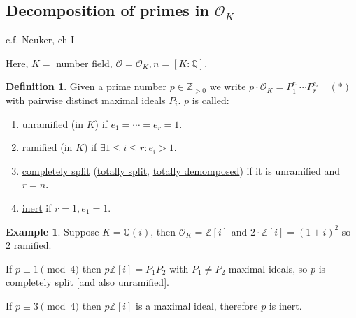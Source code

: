 \documentclass[openany]{amsbook}
\numberwithin{section}{chapter}
\theoremstyle{definition}
\newtheorem*{example}{Example}
\newtheorem*{definition}{Definition}
\begin{document}

\subsection*{Decomposition of primes in \(\mathcal{O}_K\)}

c.f. Neuker, ch I

Here, \(K =\) number field, \(\mathcal{O} = \mathcal{O}_K, n = [K : \mathbb{Q}]\).

\begin{definition}
    Given a prime number \(p \in \mathbb{Z}_{> 0}\) we write \(p \cdot \mathcal{O}_K = P_1^{e_1} \cdots P_r^{e_r} \quad (\ast)\) with pairwise distinct maximal ideals $P_i$. \(p\) is called:

    \begin{enumerate}[label=\roman*)]
        \item \underline{unramified} (in \(K\)) if \(e_1 = \cdots = e_r = 1\).
        \item \underline{ramified} (in \(K\)) if \(\exists 1 \leq i \leq r : e_i > 1\).
        \item \underline{completely split} (\underline{totally split}, \underline{totally demomposed}) if it is unramified and \(r = n\).
        \item \underline{inert} if \(r = 1, e_1 = 1\).
    \end{enumerate} 
\end{definition}

\begin{example}
    Suppose \(K = \mathbb{Q} (i)\), then \(\mathcal{O}_K = \mathbb{Z} [i]\) and \(2 \cdot \mathbb{Z} [i] = (1+i)^2\) so \(2\) ramified.

    If \(p \equiv 1 \pmod 4\) then \(p \mathbb{Z} [i] = P_1 P_2\) with \(P_1 \neq P_2\) maximal ideals, so \(p\) is completely split [and also unramified].
    
    If \(p \equiv 3 \pmod 4\) then \(p \mathbb{Z} [i]\) is a maximal ideal, therefore \(p\) is inert.

\end{example}
\end{document}

